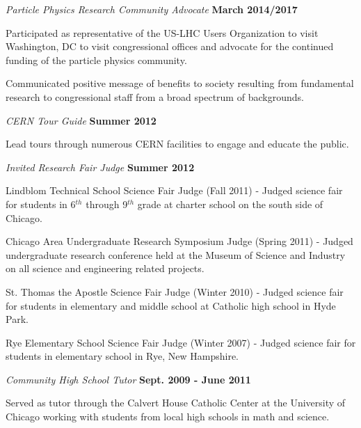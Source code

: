 \documentclass[10pt]{article}
\newenvironment{innerlist}[1][\enskip\textbullet]%
        {\begin{compactitem}[#1]}{\end{compactitem}}
\begin{document}
\begin{itemize}
\begin{innerlist}
    \end{innerlist}
\item[] \textit{Particle Physics Research Community Advocate} 
    \hfill \textbf{March 2014/2017} 
    \begin{innerlist}
	\item Participated as representative of the US-LHC Users Organization to visit Washington, DC to visit congressional offices and advocate for the continued funding of the particle physics community.
	\item Communicated positive message of benefits to society resulting from fundamental research to congressional staff from a broad spectrum of backgrounds.
    \end{innerlist}
\item[] \textit{CERN Tour Guide} 
    \hfill \textbf{Summer 2012} 
    \begin{innerlist}
	\item Lead tours through numerous CERN facilities to engage and educate the public.
    \end{innerlist}
\item[] \textit{Invited Research Fair Judge} 
    \hfill \textbf{Summer 2012} 
    \begin{innerlist}
	\item Lindblom Technical School Science Fair Judge (Fall 2011) - Judged science fair for students in 6$^{th}$ through 9$^{th}$ grade at charter school on the south side of Chicago. 
	\item Chicago Area Undergraduate Research Symposium Judge (Spring 2011) - Judged undergraduate research conference held at the Museum of Science and Industry on all science and engineering related projects.
	\item St. Thomas the Apostle Science Fair Judge (Winter 2010) - Judged science fair for students in elementary and middle school at Catholic high school in Hyde Park.
	\item Rye Elementary School Science Fair Judge (Winter 2007) - Judged science fair for students in elementary school in Rye, New Hampshire.
    \end{innerlist}
\item[] \textit{Community High School Tutor} 
    \hfill \textbf{Sept. 2009 - June 2011} 
    \begin{innerlist}
	\item Served as tutor through the Calvert House Catholic Center at the University of Chicago working with students from local high schools in math and science.

\end{innerlist}
\end{itemize}
\end{document}
